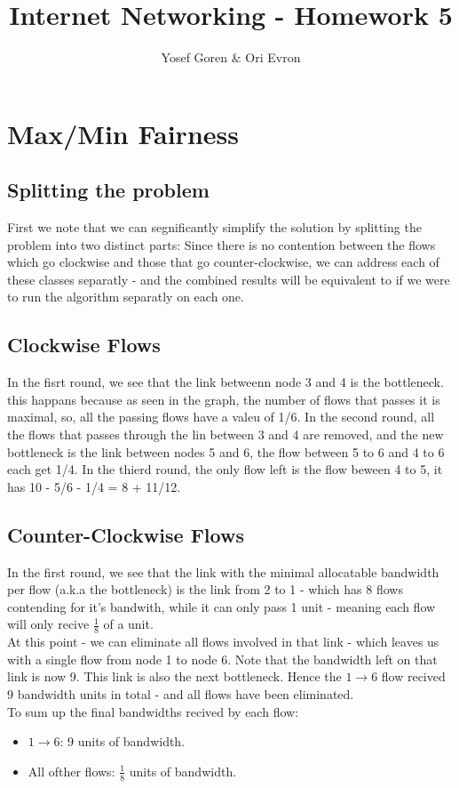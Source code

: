 \documentclass{article}
\begin{document}
\author{Yosef Goren \& Ori Evron}
\title{Internet Networking - Homework 5}
\maketitle
\tableofcontents

\section{Max/Min Fairness}
\subsection{Splitting the problem}
First we note that we can segnificantly simplify the solution by splitting
the problem into two distinct parts: Since there is no contention
between the flows which go clockwise and those that go counter-clockwise,
we can address each of these classes separatly - and the combined results
will be equivalent to if we were to run the algorithm separatly on each one.

\subsection{Clockwise Flows}
In the fisrt round, we see that the link betweenn node 3 and 4 is the bottleneck.
this happans because as seen in the graph, the number of flows that passes it is maximal,
so, all the passing flows have a valeu of 1/6.
In the second round, all the flows that passes through the lin between 3 and 4 are removed,
and the new bottleneck is the link between nodes 5 and 6, the flow  between 5 to 6 and 4 to 6 each get 1/4.
In the thierd round, the only flow left is the flow beween 4 to 5, it has 10 - 5/6 - 1/4 = 8 + 11/12.

\subsection{Counter-Clockwise Flows}
In the first round, we see that the link with the minimal
allocatable bandwidth per flow (a.k.a the bottleneck) is the link from
2 to 1 - which has 8 flows contending for it's bandwith, while it can only
pass 1 unit - meaning each flow will only recive $\frac{1}{8}$ of a unit.\\
At this point - we can eliminate all flows involved in that link - 
which leaves us with a single flow from node 1 to node 6.
Note that the bandwidth left on that link is now 9. This link is also
the next bottleneck. Hence the $1\rightarrow 6$ flow recived 9 bandwidth units
in total - and all flows have been eliminated.\\
To sum up the final bandwidths recived by each flow:
\begin{itemize}
    \item $1\rightarrow 6$: 9 units of bandwidth.
    \item All ofther flows: $\frac{1}{8}$ units of bandwidth.
\end{itemize}
\end{document}
